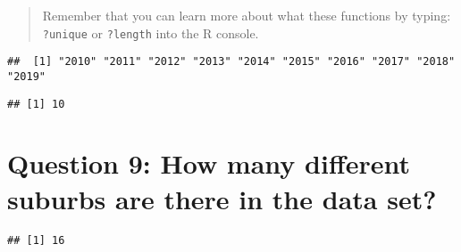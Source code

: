 \documentclass[
]{article}
\newenvironment{Shaded}{\begin{snugshade}}{\end{snugshade}}
\newcommand{\CommentTok}[1]{\textcolor[rgb]{0.56,0.35,0.01}{\textit{#1}}}
\newcommand{\KeywordTok}[1]{\textcolor[rgb]{0.13,0.29,0.53}{\textbf{#1}}}
\newcommand{\NormalTok}[1]{#1}
\newcommand{\OperatorTok}[1]{\textcolor[rgb]{0.81,0.36,0.00}{\textbf{#1}}}
\begin{document}
\begin{quote}
Remember that you can learn more about what these functions by typing:
\texttt{?unique} or \texttt{?length} into the R console.
\end{quote}

\begin{Shaded}
\end{Shaded}

\begin{verbatim}
##  [1] "2010" "2011" "2012" "2013" "2014" "2015" "2016" "2017" "2018" "2019"
\end{verbatim}

\begin{Shaded}
\end{Shaded}

\begin{verbatim}
## [1] 10
\end{verbatim}

\hypertarget{question-9-how-many-different-suburbs-are-there-in-the-data-set}{%
\section{Question 9: How many different suburbs are there in the data
set?}\label{question-9-how-many-different-suburbs-are-there-in-the-data-set}}

\begin{Shaded}
\end{Shaded}

\begin{verbatim}
## [1] 16
\end{verbatim}

\begin{Shaded}
\end{Shaded}
\end{document}
